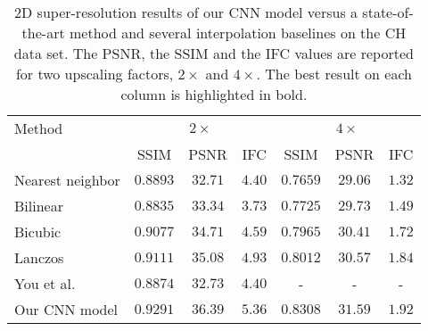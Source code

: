 \documentclass{ieeeaccess}
\begin{document}
\begin{table*}[!t]
\caption{2D super-resolution results of our CNN model versus a state-of-the-art method \cite{You-TMI-2019} and several interpolation baselines on the CH data set. The PSNR, the SSIM and the IFC values are reported for two upscaling factors, $2\times$ and $4\times$. The best result on each column is highlighted in bold.}\label{tab_ch_results_2d}
\begin{center}
\begin{tabular}{|l|c|c|c|c|c|c|}
\hline 
Method						& \multicolumn{3}{|c|}{$2\times$}					& \multicolumn{3}{|c|}{$4\times$} \\
\cline{2-7}				& SSIM				& PSNR			& IFC           			& SSIM				& PSNR			& IFC\\
\hline
\hline
Nearest neighbor		& $0.8893$ 		& $32.71$	& $4.40$				& $0.7659$		& $29.06$	& $1.32$\\ 
\hline  
Bilinear						& $0.8835$		& $33.34$	& $3.73$				& $0.7725$		& $29.73$	& $1.49$\\ 
\hline  
Bicubic						& $0.9077$		& $34.71$	& $4.59$				& $0.7965$		& $30.41$	& $1.72$\\ 
\hline   
Lanczos					& $0.9111$		& $35.08$	& $4.93$				& $0.8012$		& $30.57$	& $1.84$\\  
\hline
You et al.~\cite{You-TMI-2019} & $0.8874$		& $32.73$	& $4.40$		& -					& -				& -\\  
\hline 
Our CNN model		& $\mathbf{0.9291}$ & $\mathbf{36.39}$	& $\mathbf{5.36}$ & $\mathbf{0.8308}$ & $\mathbf{31.59}$ & $\mathbf{1.92}$\\ 
\hline 
\end{tabular}
\end{center} 
\end{table*}
\end{document}
